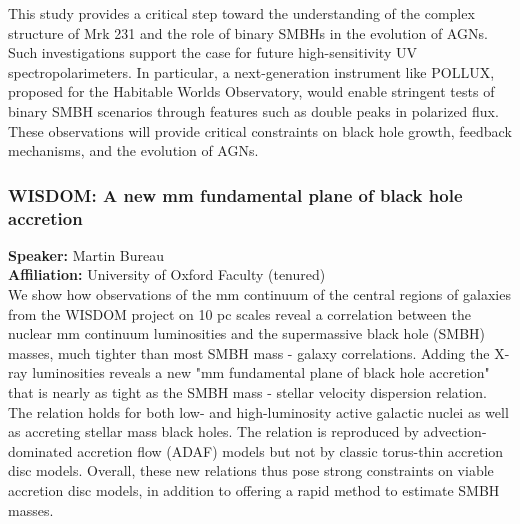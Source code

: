 This study provides a critical step toward the understanding of the complex structure of Mrk 231 and the role of binary SMBHs in the evolution of AGNs. Such investigations support the case for future high-sensitivity UV spectropolarimeters. In particular, a next-generation instrument like POLLUX, proposed for the Habitable Worlds Observatory, would enable stringent tests of binary SMBH scenarios through features such as double peaks in polarized flux. These observations will provide critical constraints on black hole growth, feedback mechanisms, and the evolution of AGNs.

\hypertarget{abs-16}{}
\subsubsection*{WISDOM: A new mm fundamental plane of black hole accretion}
\textbf{Speaker:} Martin Bureau \\
\textbf{Affiliation:} University of Oxford \textperiodcentered{} Faculty (tenured)\\
We show how observations of the mm continuum of the central regions of galaxies from the WISDOM project on 10 pc scales reveal a correlation between the nuclear mm continuum luminosities and the supermassive black hole (SMBH) masses, much tighter than most SMBH mass - galaxy correlations. Adding the X-ray luminosities reveals a new "mm fundamental plane of black hole accretion" that is nearly as tight as the SMBH mass - stellar velocity dispersion relation. The relation holds for both low- and high-luminosity active galactic nuclei as well as accreting stellar mass black holes. The relation is reproduced by advection-dominated accretion flow (ADAF) models but not by classic torus-thin accretion disc models. Overall, these new relations thus pose strong constraints on viable accretion disc models, in addition to offering a rapid method to estimate SMBH masses.

\hypertarget{abs-17}{}
